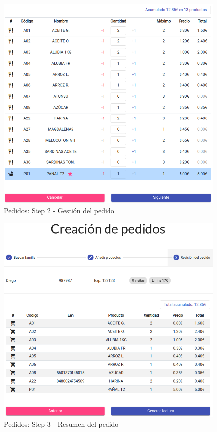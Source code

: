 \begin{figure}[h]
\centering
\includegraphics[scale=0.5]{archivos/pedidos-productos-resumen-botones.png}
\caption{Pedidos: Step 2 - Gestión del pedido}
\label{fig:pedidos_step2_2}
\end{figure}
\clearpage
\begin{figure}[h]
\centering
\includegraphics[scale=0.47]{archivos/pedidios-step3.png}
\caption{Pedidos: Step 3 - Resumen del pedido}
\label{fig:pedidos_step3}
\end{figure}
